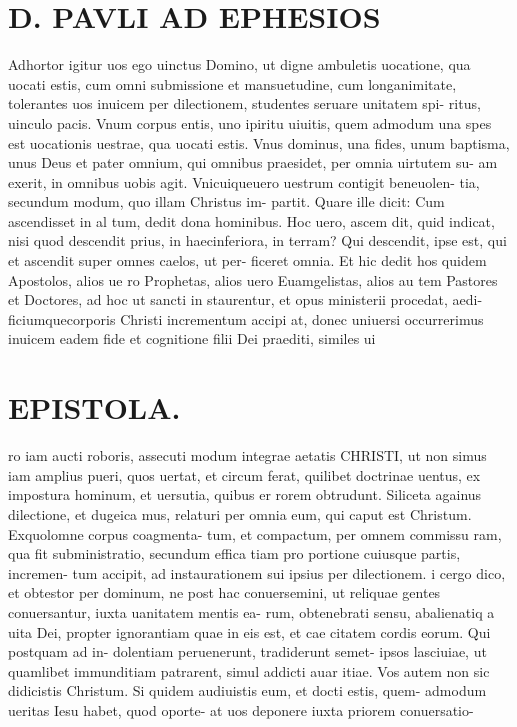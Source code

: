 \documentclass{article}
\begin{document}
\begin{pages}
\section*{D. PAVLI AD EPHESIOS }
\marginpar{[ p.2. ]}
\marginpar{[ p.3.  ]}
\marginpar{[ p.4.  ]}\pstart Adhortor igitur uos ego uinctus Domino, ut digne ambuletis uocatione, qua uocati estis, cum omni submissione et mansuetudine, cum longanimitate, tolerantes uos inuicem per dilectionem, studentes seruare unitatem spi- ritus, uinculo pacis.  \pend\pstart Vnum corpus entis, uno ipiritu uiuitis, quem admodum una spes est uocationis uestrae, qua uocati estis. Vnus dominus, una fides, unum baptisma, unus Deus et pater omnium, qui omnibus praesidet, per omnia uirtutem su- am exerit, in omnibus uobis agit.  \pend\pstart Vnicuiqueuero uestrum contigit beneuolen- tia, secundum modum, quo illam Christus im- partit. Quare ille dicit: Cum ascendisset in al tum, dedit dona hominibus. Hoc uero, ascem dit, quid indicat, nisi quod descendit prius, in haecinferiora, in terram? Qui descendit, ipse est, qui et ascendit super omnes caelos, ut per- ficeret omnia.  \pend\pstart Et hic dedit hos quidem Apostolos, alios ue ro Prophetas, alios uero Euamgelistas, alios au tem Pastores et Doctores, ad hoc ut sancti in staurentur, et opus ministerii procedat, aedi- ficiumquecorporis Christi incrementum accipi at, donec uniuersi occurrerimus inuicem eadem fide et cognitione filii Dei praediti, similes ui  \pend
\section*{EPISTOLA. }
\marginpar{[ p.1 ]}
\marginpar{[ p.r. ]}
\marginpar{[ p.„ ]}
\marginpar{[ p.7.  ]}\pstart ro iam aucti roboris, assecuti modum integrae aetatis CHRISTI, ut non simus iam amplius pueri, quos uertat, et circum ferat, quilibet doctrinae uentus, ex impostura hominum, et uersutia, quibus er rorem obtrudunt.  \pend\pstart Siliceta againus dilectione, et dugeica mus, relaturi per omnia eum, qui caput est Christum. Exquolomne corpus coagmenta- tum, et compactum, per omnem commissu ram, qua fit subministratio, secundum effica tiam pro portione cuiusque partis, incremen- tum accipit, ad instaurationem sui ipsius per dilectionem.  \pend\pstart i cergo dico, et obtestor per dominum, ne post hac conuersemini, ut reliquae gentes conuersantur, iuxta uanitatem mentis ea- rum, obtenebrati sensu, abalienatiq a uita Dei, propter ignorantiam quae in eis est, et cae citatem cordis eorum. Qui postquam ad in- dolentiam peruenerunt, tradiderunt semet- ipsos lasciuiae, ut quamlibet immunditiam patrarent, simul addicti auar itiae.  \pend\pstart Vos autem non sic didicistis Christum. Si quidem audiuistis eum, et docti estis, quem- admodum ueritas Iesu habet, quod oporte- at uos deponere iuxta priorem conuersatio-  \pend

\end{pages}
\end{document}
